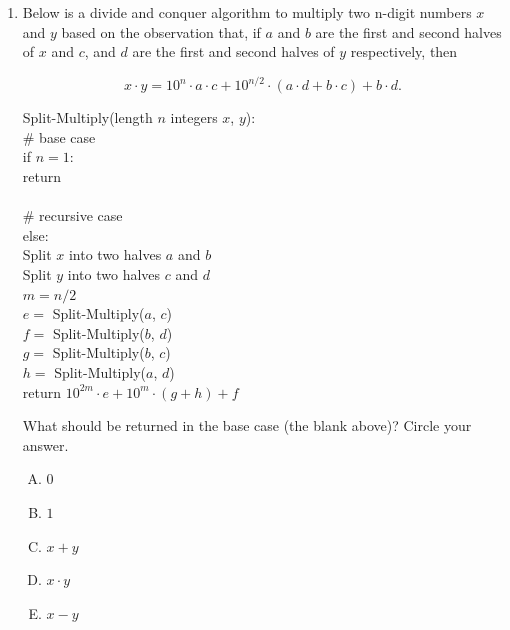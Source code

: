\documentclass[11pt]{article}
\begin{document}
\begin{enumerate}
\begin{enumerate}[A.]
    \item $\log_4 n$
    \item $\log_3 n$
    \item $n$
    \item $^3\sqrt{n}$
    \item $n \log_3 4$

\end{enumerate}

The following questions refer to the problem of multiplying two n-digit
numbers.

\item Below is a divide and conquer algorithm to multiply two n-digit numbers $x$
and $y$ based on the observation that, if $a$ and $b$ are the first and second halves
of $x$ and $c$, and $d$ are the first and second halves of $y$ respectively, then

\[
x \cdot y = 10^n \cdot a \cdot c + 10^{n/2} \cdot (a \cdot d + b \cdot c) + b \cdot d.
\]

    \begin{algo}
    Split-Multiply(length $n$ integers $x$, $y$):\+\\
    \# base case\\
    if $n = 1$:\+\\
        return \underline{\hspace{1in}}\- \\
    \\
    \# recursive case\\
    else:\+\\
    Split $x$ into two halves $a$ and $b$\\
    Split $y$ into two halves $c$ and $d$\\
    $m=n/2$\\
    $e = $ Split-Multiply($a$, $c$) \\
    $f = $ Split-Multiply($b$, $d$) \\
    $g = $ Split-Multiply($b$, $c$) \\
    $h = $ Split-Multiply($a$, $d$) \\
    return $10^{2m} \cdot e + 10^{m} \cdot (g + h) + f$
    \end{algo} 

What should be returned in the base case (the blank above)? Circle your answer.
\begin{enumerate}[A.]
    \item $0$
    \item $1$
    \item $x + y$
    \item $x \cdot y$
    \item $x - y$
\end{enumerate}


\end{enumerate}
\end{document}
